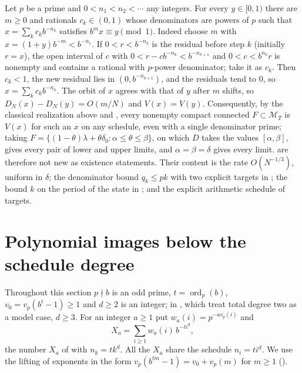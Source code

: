 \documentclass[11pt]{article}
\newcommand{\Minv}{\mathcal M_T}
\DeclareMathOperator{\ord}{ord}
\begin{document}
\begin{remark}\label{rem:qualitative}
Let $p$ be a prime and $0<n_1<n_2<\cdots$ any integers. For every $y\in[0,1)$ there are $m\ge0$ and
rationals $c_k\in(0,1)$ whose denominators are powers of $p$ such that
$x=\sum_kc_kb^{-n_k}$ satisfies $b^mx\equiv y\pmod1$. Indeed choose $m$ with
$x=(1+y)b^{-m}<b^{-n_1}$. If $0<r<b^{-n_k}$ is the residual before step $k$ (initially $r=x$), the
open interval of $c$ with $0<r-cb^{-n_k}<b^{-n_{k+1}}$ and $0<c<b^{n_k}r$ is nonempty and contains a
rational with $p$-power denominator; take it as $c_k$. Then $c_k<1$, the new residual lies in
$(0,b^{-n_{k+1}})$, and the residuals tend to $0$, so $x=\sum_kc_kb^{-n_k}$. The orbit of $x$ agrees
with that of $y$ after $m$ shifts, so $D_N(x)-D_N(y)=O(m/N)$ and $V(x)=V(y)$. Consequently, by the
classical realization above and , every nonempty compact connected $F\subset\Minv$ is
$V(x)$ for such an $x$ on any schedule, even with a single denominator prime; taking
$F=\{(1-\theta)\lambda+\theta\delta_0:\alpha\le\theta\le\beta\}$, on which $D$ takes the values
$[\alpha,\beta]$, gives every pair of lower and upper limits, and $\alpha=\beta=\delta$ gives every limit.
 are therefore not new as existence statements. Their content
is the rate $O(N^{-1/3})$, uniform in $\delta$; the denominator bound $q_k\le pk$ with two explicit
targets in ; the bound $k$ on the period of the state in
; and the explicit arithmetic schedule of targets.
\end{remark}

\section{Polynomial images below the schedule degree}\label{sec:quadratic}

Throughout this section $p\nmid b$ is an odd prime, $t=\ord_p(b)$, $v_0=v_p(b^t-1)\ge1$ and $d\ge2$ is an
integer; in , which treat total degree two
as a model case, $d\ge3$.
For an integer $a\ge1$ put $w_a(i)=p^{-av_p(i)}$ and
\[
X_a=\sum_{i\ge1}w_a(i)\,b^{-ti^d},
\]
the number $X_a$ of  with $n_k=tk^d$. All the $X_a$ share the schedule $n_i=ti^d$. We
use the lifting of exponents in the form $v_p(b^{tm}-1)=v_0+v_p(m)$ for $m\ge1$ ().
\end{document}
